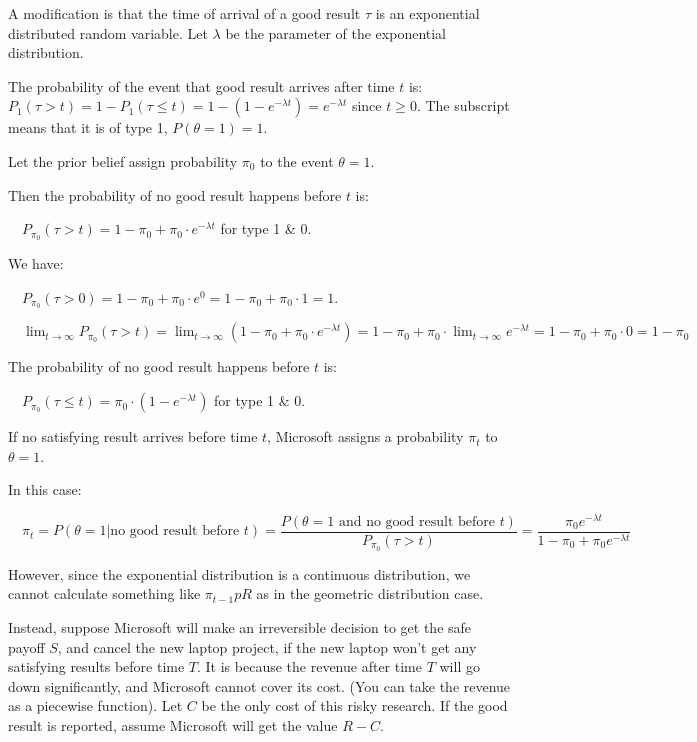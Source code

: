 \documentclass{article}
\begin{document}
A modification is that the time of arrival of a good result $\tau $ is an exponential distributed random variable. Let $\lambda$ be the parameter of the exponential distribution. 

The probability of the event that good result arrives after time $t$ is: $P_{1}\left(\tau>t\right)=1-P_{1}\left(\tau\leqslant t\right)=1-\left(1-e^{-\lambda t}\right)=e^{-\lambda t}$ since $t\geqslant0$. The subscript means that it is of type 1, $P\left(\theta=1\right)=1$. 

Let the prior belief assign probability $\pi_{0}$ to the event $\theta=1$. 

Then the probability of no good result happens before $t$ is:

$\quad P_{\pi_{0}}\left(\tau>t\right)=1-\pi_{0}+\pi_{0}\cdot e^{-\lambda t}$ for type 1 \& 0.

We have:

$\quad P_{\pi_{0}}\left(\tau>0\right)=1-\pi_{0}+\pi_{0}\cdot e^{0}=1-\pi_{0}+\pi_{0}\cdot1=1$.

$\quad \displaystyle \lim_{t\to\infty}P_{\pi_{0}}\left(\tau>t\right)=\lim_{t\to\infty}\left(1-\pi_{0}+\pi_{0}\cdot e^{-\lambda t}\right)=1-\pi_{0}+\pi_{0}\cdot\lim_{t\to\infty}e^{-\lambda t}=1-\pi_{0}+\pi_{0}\cdot0=1-\pi_{0}$

The probability of no good result happens before $t$ is:

$\quad P_{\pi_{0}}\left(\tau\leqslant t\right)=\pi_{0}\cdot \left(1-e^{-\lambda t}\right)$ for type 1 \& 0.

If no satisfying result arrives before time $t$, Microsoft assigns a probability $\pi_{t}$ to $\theta=1$.

In this case:

$\quad \pi_{t}=P\left(\theta=1|\text{no good result before } t\right)=\dfrac{P\left(\theta=1\text{ and no good result before } t\right)}{P_{\pi_{0}}\left(\tau>t\right)}=\dfrac{\pi_{0}e^{-\lambda t}}{1-\pi_{0}+\pi_{0}e^{-\lambda t}}$

However, since the exponential distribution is a continuous distribution, we cannot calculate something like $\pi_{t-1}pR$ as in the geometric distribution case.

Instead, suppose Microsoft will make an irreversible decision to get the safe payoff $S$, and cancel the new laptop project, if the new laptop won't get any satisfying results before time $T$. It is because the revenue after time $T$ will go down significantly, and Microsoft cannot cover its cost. (You can take the revenue as a piecewise function). Let $C$ be the only cost of this risky research. If the good result is reported, assume Microsoft will get the value $R-C$.
\end{document}
